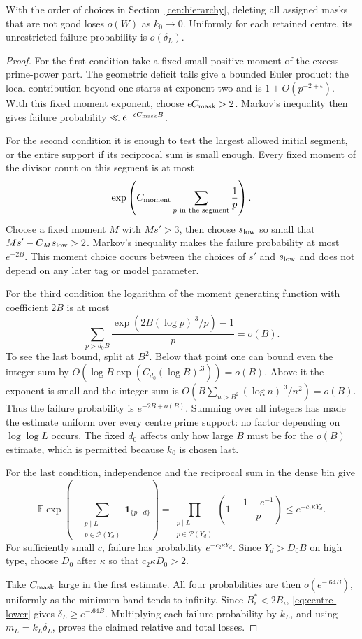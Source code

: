 \begin{lemma}
\label{pre:mask-purge}
With the order of choices in Section~\ref{cen:hierarchy}, deleting
all assigned masks that are not good loses $o(W)$ as $k_0\to0$.
Uniformly for each retained centre, its unrestricted failure
probability is $o(\delta_L)$.
\end{lemma}

\begin{proof}
For the first condition take a fixed small positive moment of the
excess prime-power part. The geometric deficit tails give a bounded
Euler product: the local contribution beyond one starts at exponent
two and is $1+O(p^{-2+\epsilon})$. With this fixed moment exponent,
choose $\epsilon C_{\rm mask}>2$. Markov's inequality then gives
failure probability $\ll e^{-\epsilon C_{\rm mask}B}$.

For the second condition it is enough to test the largest allowed
initial segment, or the entire support if its reciprocal sum is
small enough. Every fixed moment of the divisor count on this
segment is at most
\[
 \exp\left(C_{\rm moment}\sum_{p\text{ in the segment}}\frac1p\right).
\]
Choose a fixed moment $M$ with $Ms'>3$, then choose $s_{\rm low}$
so small that $Ms'-C_Ms_{\rm low}>2$. Markov's inequality makes
the failure probability at most $e^{-2B}$. This moment choice
occurs between the choices of $s'$ and $s_{\rm low}$ and does not
depend on any later tag or model parameter.

For the third condition the logarithm of the moment generating
function with coefficient $2B$ is at most
\[
 \sum_{p>d_0B}
 \frac{\exp(2B(\log p)^{.3}/p)-1}{p}=o(B).
\]
To see the last bound, split at $B^2$. Below that point one can
bound even the integer sum by
$O(\log B\exp(C_{d_0}(\log B)^{.3}))=o(B)$. Above it the
exponent is small and the integer sum is
$O(B\sum_{n>B^2}(\log n)^{.3}/n^2)=o(B)$.
Thus the failure probability is $e^{-2B+o(B)}$. Summing over all
integers has made the estimate uniform over every centre prime
support: no factor depending on $\log\log L$ occurs. The fixed
$d_0$ affects only how large $B$ must be for the $o(B)$ estimate,
which is permitted because $k_0$ is chosen last.

For the last condition, independence and the reciprocal sum in
the dense bin give
\[
 \mathbb E\exp\left(-\sum_{\substack{p\mid L\\p\in\mathcal P(Y_d)}}
 \mathbf1_{\{p\mid d\}}\right)
 =\prod_{\substack{p\mid L\\p\in\mathcal P(Y_d)}}
 \left(1-\frac{1-e^{-1}}p\right)
 \le e^{-c_1\kappa Y_d}.
\]
For sufficiently small $c$, failure has probability
$e^{-c_2\kappa Y_d}$. Since $Y_d>D_0B$ on high type, choose
$D_0$ after $\kappa$ so that $c_2\kappa D_0>2$.

Take $C_{\rm mask}$ large in the first estimate. All four
probabilities are then $o(e^{-.64B})$, uniformly as the minimum
band tends to infinity. Since $B_i^*<2B_i$,
\eqref{eq:centre-lower} gives $\delta_L\ge e^{-.64B}$.
Multiplying each failure probability by $k_L$, and using
$m_L=k_L\delta_L$, proves the claimed relative and total losses.
\end{proof}

